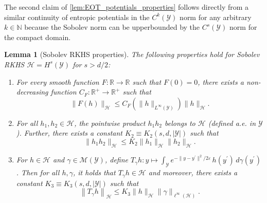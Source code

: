 \documentclass{article}
\theoremstyle{plain}
\newtheorem{lemma}[theorem]{Lemma}
\theoremstyle{definition}
\theoremstyle{remark}
\newcommand{\R}{\mathbb{R}}
\newcommand{\N}{\mathbb{N}}
\newcommand{\of}[1]{\left(#1\right)}
\newcommand{\cH}{\mathcal{H}}
\newcommand{\cM}{\mathcal{M}}
\newcommand{\cY}{\mathcal{Y}}
\newcommand{\1}{\mathbbm{1}}
\newcommand{\eps}{\varepsilon}
\newcommand{\norm}[1]{\left \| #1 \right \|}
\theoremstyle{plain}
\theoremstyle{definition}
\begin{document}
The second claim of \cref{lem:EOT_potentials_properties} follows directly from a similar continuity of entropic potentials in the $C^k(\cY)$ norm for any arbitrary $k\in\N$ \citep[Lem.~1]{goldfeld2024limit} because the Sobolev norm can be upperbounded by the $C^s(\cY)$ norm for the compact domain.

\begin{lemma}[Sobolev RKHS properties]\label{lem:Sobolev_RKHS_properties}
    The following properties hold for Sobolev RKHS $\cH = H^s(\cY)$ for $s > d/2$:
    \begin{enumerate}
        \item For every smooth function $F: \R \to \R$ such that $F(0) = 0$, there exists a non-decreasing function $C_F: \R^+ \to \R^+$ such that 
        \[
        \|F(h)\|_\cH \leq C_F\of{\| h\|_{L^\infty(\cY)}} \|h\|_\cH.
        \]
        \item For all $h_1, h_2 \in \cH$, the pointwise product $h_1 h_2$ belongs to $\cH$ (defined a.e. in $\cY$). Further, there exists a constant $K_2 \equiv K_2(s, d, |\cY|)$ such that 
        \[
        \| h_1 h_2\|_\cH \leq K_2 \|h_1\|_\cH \|h_2\|_\cH.
        \]
        \item For $h\in\cH$ and $\gamma \in \cM(\cY)$, define $T_\gamma h: y \mapsto \int_\cY e^{-\|y-y^\prime\|^2/2\eps} \, h(y^\prime) \, d\gamma(y^\prime)$. Then for all $h, \gamma$, it holds that $T_\gamma h \in \cH$ and moreover, there exists a constant $K_3 \equiv K_3(s, d, |\cY|)$ such that
        \[
        \norm{T_\gamma h}_{\cH} \leq K_3 \|h\|_\cH \|\gamma\|_{\ell^\infty(\cH)}.
        \]
    \end{enumerate}
\end{lemma}
\end{document}
